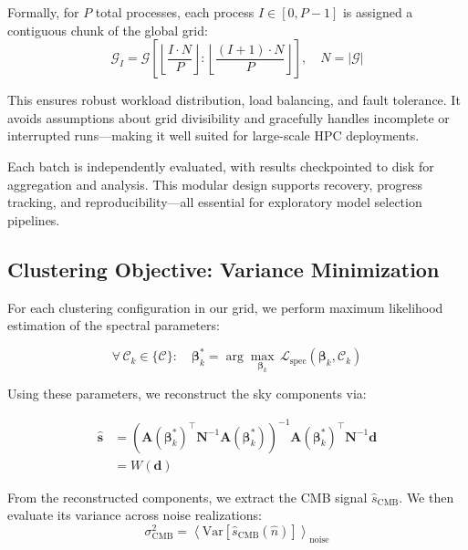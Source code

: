 \documentclass[%
 reprint,
bibnotes,
 amsmath,amssymb,
 aps,
floatfix, 
]{revtex4-2}
\begin{document}
Formally, for \( P \) total processes, each process \( I \in [0, P-1] \) is assigned a contiguous chunk of the global grid:
\[
\mathcal{G}_I = \mathcal{G} \left[ \left\lfloor \frac{I \cdot N}{P} \right\rfloor : \left\lfloor \frac{(I+1) \cdot N}{P} \right\rfloor \right], \quad N = |\mathcal{G}|
\]

This ensures robust workload distribution, load balancing, and fault tolerance. It avoids assumptions about grid divisibility and gracefully handles incomplete or interrupted runs—making it well suited for large-scale HPC deployments.

Each batch is independently evaluated, with results checkpointed to disk for aggregation and analysis. This modular design supports recovery, progress tracking, and reproducibility—all essential for exploratory model selection pipelines.

\subsection{Clustering Objective: Variance Minimization}
\label{subsec:variance_minimization}

For each clustering configuration in our grid, we perform maximum likelihood estimation of the spectral parameters:

\begin{equation}
\label{eq:grid_search}
\forall\, \mathcal{C}_k \in \{\mathcal{C}\} : \quad \boldsymbol{\beta}_k^* = \arg \max_{\boldsymbol{\beta}_k} \, \mathcal{L}_{\mathrm{spec}}(\boldsymbol{\beta}_k, \mathcal{C}_k)
\end{equation}

Using these parameters, we reconstruct the sky components via:

\begin{align}
\hat{\mathbf{s}} &= \left( \mathbf{A}(\boldsymbol{\beta}_k^*)^\top \mathbf{N}^{-1} \mathbf{A}(\boldsymbol{\beta}_k^*) \right)^{-1} \mathbf{A}(\boldsymbol{\beta}_k^*)^\top \mathbf{N}^{-1} \mathbf{d} \label{eq:recon_operator} \\
                 &= W(\mathbf{d})
\end{align}


From the reconstructed components, we extract the CMB signal \( \hat{s}_{\mathrm{CMB}} \). We then evaluate its variance across noise realizations:
\begin{equation}
\label{eq:min_var}
    \sigma^2_{\mathrm{CMB}} = \left\langle \mathrm{Var} \left[ \hat{s}_{\mathrm{CMB}}(\hat{n}) \right] \right\rangle_{\text{noise}}
\end{equation}
\end{document}
